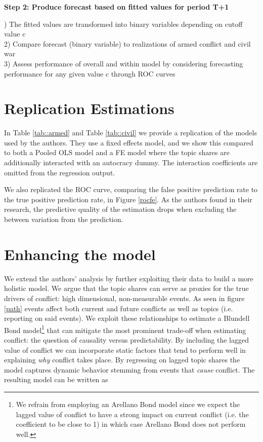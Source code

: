 \noindent \textbf{Step 2: Produce forecast based on fitted values for period T+1}

) The fitted values are transformed into binary variables depending on cutoff value c\\
2) Compare forecast (binary variable) to realizations of armed conflict and civil war\\
3) Assess performance of overall and within model by considering forecasting performance for any given value c through ROC curves

\section{Replication Estimations}
In Table \ref{tab::armed} and Table \ref{tab::civil} we provide a replication of the models used by the authors.
They use a fixed effects model, and we show this compared to both a Pooled OLS model and a FE model where the topic shares are additionally interacted with an autocracy dummy. The interaction coefficients are omitted from the regression output.

We also replicated the ROC curve, comparing the false positive prediction rate to the true positive prediction rate, in Figure \ref{rocfe}.
As the authors found in their research, the predictive quality of the estimation drops when excluding the between variation from the prediction.

\section{Enhancing the model}
We extend the authors' analysis by further exploiting their data to build a more holistic model.
We argue that the topic shares can serve as proxies for the true drivers of conflict: high dimensional, non-measurable events.
As seen in figure \ref{path} events affect both current and future conflicts as well as topics (i.e. reporting on said events).
We exploit these relationships to estimate a Blundell Bond model\footnote{We refrain from employing an Arellano Bond model since we expect the lagged value of conflict to have a strong impact on current conflict (i.e. the coefficient to be close to 1) in which case Arellano Bond does not perform well.} that can mitigate the most prominent trade-off when estimating conflict: the question of causality versus predictability.
By including the lagged value of conflict we can incorporate static factors that tend to perform well in explaining \textit{why} conflict takes place.
By regressing on lagged topic shares the model captures dynamic behavior stemming from events that \textit{cause} conflict.
The resulting model can be written as


